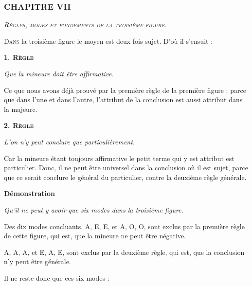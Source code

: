 \subsubsection{\centering \Large CHAPITRE VII}
\begin{center}\emph{\large\scshape Règles, modes et fondements de la troisième figure.}\end{center}

	\lettrine{D}{ans} la troisième figure le moyen est deux fois sujet. D'où il s'ensuit :

\begin{center}{\bfseries\scshape\large 1. Règle}\end{center}

\emph{Que la mineure doit être affirmative.}

Ce que nous avons déjà prouvé par la première règle de la première figure ; parce que dans l'une et dans l'autre, l'attribut de la conclusion est aussi attribut dans la majeure.

\begin{center}{\bfseries\scshape\large 2. Règle}\end{center}

\emph{L'on n'y peut conclure que particulièrement.}

Car la mineure étant toujours affirmative le petit terme qui y est attribut est particulier. Donc, il ne peut être universel dans la conclusion où il est sujet, parce que ce serait conclure le général du particulier, contre la deuxième règle générale.

\bigbreak

\begin{center}{\bfseries Démonstration}\end{center}

\emph{Qu'il ne peut y avoir que six modes dans la troisième figure.}

Des dix modes concluants, A, E, E, et A, O, O, sont exclus par la première règle de cette figure, qui est, que la mineure ne peut être négative.

A, A, A, et E, A, E, sont exclus par la deuxième règle, qui est, que la conclusion n'y peut être générale.

Il ne reste donc que ces six modes :


